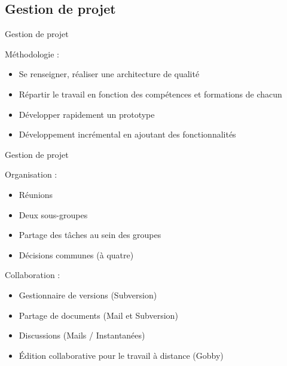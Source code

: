 \documentclass{beamer}
\begin{document}
      \subsection{Gestion de projet}
            \begin{frame}{Gestion de projet}
                  \begin{block}{Méthodologie :}
                  \begin{itemize}
                  \item Se renseigner, réaliser une architecture de qualité
                  \item Répartir le travail en fonction des compétences et formations de chacun
                  \item Développer rapidement un prototype
                  \item Développement incrémental en ajoutant des fonctionnalités
                  \end{itemize}
                  \end{block}
            \end{frame}
            
            \begin{frame}{Gestion de projet}
                  \begin{block}{Organisation :}
                  \begin{itemize}
                        \item{Réunions}
                        \item{Deux sous-groupes}
                        \item{Partage des tâches au sein des groupes}
                        \item{Décisions communes (à quatre)}
                  \end{itemize}
                  \end{block}
            
            \begin{block}{Collaboration :}
                  \begin{itemize}
                        \item{Gestionnaire de versions (Subversion)}
                        \item{Partage de documents (Mail et Subversion)}
                        \item{Discussions (Mails / Instantanées)}
                        \item{Édition collaborative pour le travail à distance (Gobby)}
                  \end{itemize}
         \end{block}
            \end{frame}
            
\end{document}
